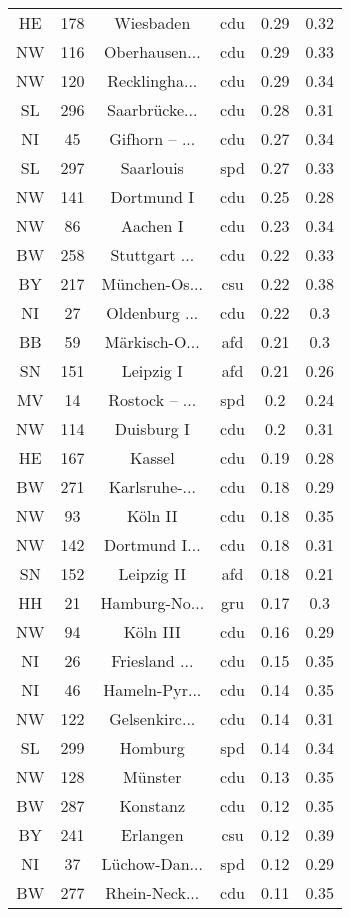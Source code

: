 \begin{table}[!htbp]
\begin{tabular}{@{\extracolsep{5pt}} cccccc}
HE & 178 & Wiesbaden & cdu & 0.29 & 0.32 \\ 
NW & 116 & Oberhausen... & cdu & 0.29 & 0.33 \\ 
NW & 120 & Recklingha... & cdu & 0.29 & 0.34 \\ 
SL & 296 & Saarbrücke... & cdu & 0.28 & 0.31 \\ 
NI & 45 & Gifhorn – ... & cdu & 0.27 & 0.34 \\ 
SL & 297 & Saarlouis & spd & 0.27 & 0.33 \\ 
NW & 141 & Dortmund I & cdu & 0.25 & 0.28 \\ 
NW & 86 & Aachen I & cdu & 0.23 & 0.34 \\ 
BW & 258 & Stuttgart ... & cdu & 0.22 & 0.33 \\ 
BY & 217 & München-Os... & csu & 0.22 & 0.38 \\ 
NI & 27 & Oldenburg ... & cdu & 0.22 & 0.3 \\ 
BB & 59 & Märkisch-O... & afd & 0.21 & 0.3 \\ 
SN & 151 & Leipzig I & afd & 0.21 & 0.26 \\ 
MV & 14 & Rostock – ... & spd & 0.2 & 0.24 \\ 
NW & 114 & Duisburg I & cdu & 0.2 & 0.31 \\ 
HE & 167 & Kassel & cdu & 0.19 & 0.28 \\ 
BW & 271 & Karlsruhe-... & cdu & 0.18 & 0.29 \\ 
NW & 93 & Köln II & cdu & 0.18 & 0.35 \\ 
NW & 142 & Dortmund I... & cdu & 0.18 & 0.31 \\ 
SN & 152 & Leipzig II & afd & 0.18 & 0.21 \\ 
HH & 21 & Hamburg-No... & gru & 0.17 & 0.3 \\ 
NW & 94 & Köln III & cdu & 0.16 & 0.29 \\ 
NI & 26 & Friesland ... & cdu & 0.15 & 0.35 \\ 
NI & 46 & Hameln-Pyr... & cdu & 0.14 & 0.35 \\ 
NW & 122 & Gelsenkirc... & cdu & 0.14 & 0.31 \\ 
SL & 299 & Homburg & spd & 0.14 & 0.34 \\ 
NW & 128 & Münster & cdu & 0.13 & 0.35 \\ 
BW & 287 & Konstanz & cdu & 0.12 & 0.35 \\ 
BY & 241 & Erlangen & csu & 0.12 & 0.39 \\ 
NI & 37 & Lüchow-Dan... & spd & 0.12 & 0.29 \\ 
BW & 277 & Rhein-Neck... & cdu & 0.11 & 0.35 \\ 

\end{tabular}
\end{table}
